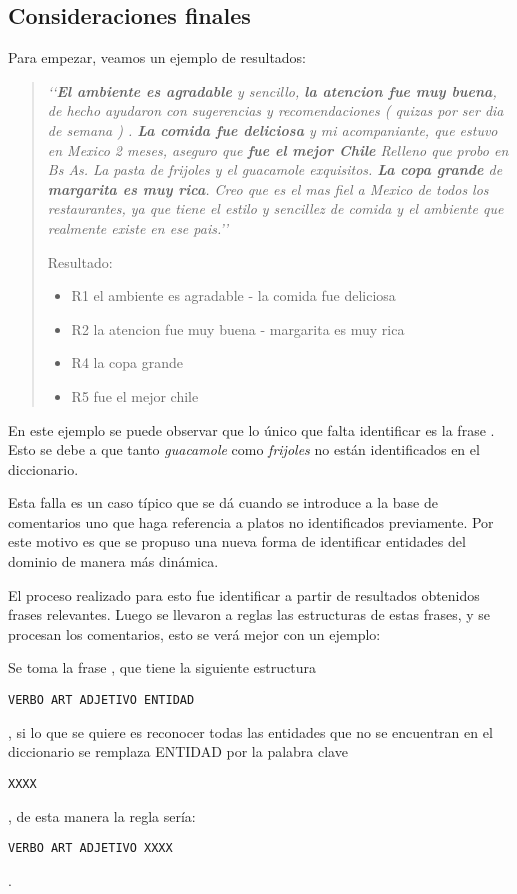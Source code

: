 \subsection{Consideraciones finales}

Para empezar, veamos un ejemplo de resultados:

\begin{quotation}

\emph{
\lq{}\lq{}{\bf El ambiente es agradable} y sencillo, {\bf la atencion fue muy buena}, de hecho ayudaron con sugerencias y recomendaciones ( quizas por ser dia de semana ) .  {\bf La comida fue deliciosa} y mi acompaniante, que estuvo en Mexico 2 meses, aseguro que {\bf fue el mejor Chile} Relleno que probo en Bs As. La pasta de frijoles y el guacamole exquisitos. {\bf La copa grande} de {\bf margarita es muy rica}. Creo que es el mas fiel a Mexico de todos los restaurantes, ya que tiene el estilo y sencillez de comida y el ambiente que realmente existe en ese pais.\rq{}\rq{}
}

Resultado:
\begin{itemize}
\item R1  el ambiente es agradable - la comida fue deliciosa
\item R2  la atencion fue muy buena - margarita es muy rica
\item R4  la copa grande
\item R5  fue el mejor chile
\end{itemize}

\end{quotation}

En este ejemplo se puede observar que lo único que falta identificar es la frase . Esto se debe a que tanto \emph{guacamole} como \emph{frijoles} no están identificados en el diccionario.

Esta falla es un caso típico que se dá cuando se introduce a la base de comentarios uno que haga referencia a platos no identificados previamente. Por este motivo es que se propuso una nueva forma de identificar entidades del dominio de manera más dinámica.

El proceso realizado para esto fue identificar a partir de resultados obtenidos frases relevantes. Luego se llevaron a reglas las estructuras de estas frases, y se procesan los comentarios, esto se verá mejor con un ejemplo:

Se toma la frase , que tiene la siguiente estructura \begin{verbatim}VERBO ART ADJETIVO ENTIDAD\end{verbatim}, si lo que se quiere es reconocer todas las entidades que no se encuentran en el diccionario se remplaza ENTIDAD por la palabra clave \begin{verbatim}XXXX\end{verbatim}, de esta manera la regla sería: \begin{verbatim}VERBO ART ADJETIVO XXXX\end{verbatim}. 

